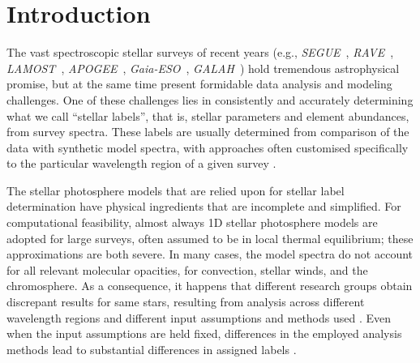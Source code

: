 \documentclass[12pt, preprint]{aastex}
\newcommand{\apogee}{\textsl{APOGEE}}
\newcommand{\galah}{\textsl{GALAH}}
\newcommand{\segue}{\textsl{SEGUE}}
\newcommand{\gaiaeso}{\textsl{Gaia-ESO}}
\newcommand{\rave}{\textsl{RAVE}}
\newcommand{\lamost}{\textsl{LAMOST}}
\begin{document}

\section{Introduction}\label{sec:Intro}

The vast spectroscopic stellar surveys of recent years (e.g., \segue\ \citep{Beers2006}, \rave\ \citep{Steinmetz2006}, \lamost\ \citep{Newberg2012}, \apogee\ \citep{Majewski2012}, \gaiaeso\ \citep{Gilmore2012}, \galah\ \citep{Freeman2012}) hold tremendous astrophysical promise, but at the same time present formidable data analysis and modeling challenges. 
One of these challenges lies in consistently and accurately determining what we call ``stellar labels'', that is, stellar parameters and element abundances, from survey spectra. 
These labels are usually determined from comparison of the data with synthetic model spectra, with approaches often 
customised specifically to the particular wavelength region of a given survey \citep[e.g.,][]{ Lee2006, Boeche2011, Liu2014, Meszaros2013, Sm2014}. 

The stellar photosphere models that are relied upon for stellar label determination have physical ingredients that are incomplete and simplified. 
For computational feasibility, almost always 1D stellar photosphere models are adopted for large surveys, often assumed to be in local thermal equilibrium; these approximations are both severe. 
In many cases, the model spectra do not account for all relevant  molecular opacities, for convection, stellar winds, and the chromosphere. 
As a consequence, it happens that different research groups obtain discrepant results for same stars, resulting from analysis across different wavelength regions and different input assumptions and methods used \citep[e.g.,][]{Hinkel2014, Jofre2014, AP1999}. Even when the input assumptions are held fixed, differences in the employed analysis methods lead to substantial differences in assigned labels \citep[e.g.][]{Sm2014}.
\end{document}

